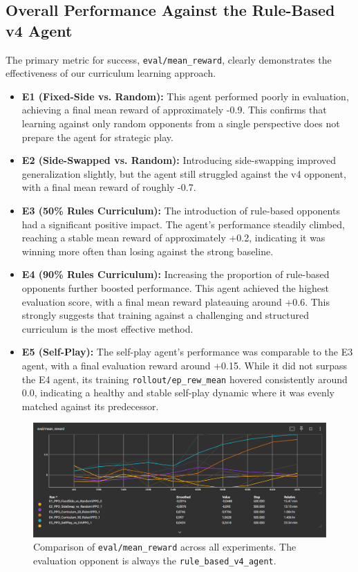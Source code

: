 \documentclass[conference]{IEEEtran}
\begin{document}
\subsection{Overall Performance Against the Rule-Based v4 Agent}
The primary metric for success, \texttt{eval/mean\_reward}, clearly demonstrates the effectiveness of our curriculum learning approach.
\begin{itemize}
    \item \textbf{E1 (Fixed-Side vs. Random):} This agent performed poorly in evaluation, achieving a final mean reward of approximately -0.9. This confirms that learning against only random opponents from a single perspective does not prepare the agent for strategic play.
    \item \textbf{E2 (Side-Swapped vs. Random):} Introducing side-swapping improved generalization slightly, but the agent still struggled against the v4 opponent, with a final mean reward of roughly -0.7.
    \item \textbf{E3 (50\% Rules Curriculum):} The introduction of rule-based opponents had a significant positive impact. The agent's performance steadily climbed, reaching a stable mean reward of approximately +0.2, indicating it was winning more often than losing against the strong baseline.
    \item \textbf{E4 (90\% Rules Curriculum):} Increasing the proportion of rule-based opponents further boosted performance. This agent achieved the highest evaluation score, with a final mean reward plateauing around +0.6. This strongly suggests that training against a challenging and structured curriculum is the most effective method.
    \item \textbf{E5 (Self-Play):} The self-play agent's performance was comparable to the E3 agent, with a final evaluation reward around +0.15. While it did not surpass the E4 agent, its training \texttt{rollout/ep\_rew\_mean} hovered consistently around 0.0, indicating a healthy and stable self-play dynamic where it was evenly matched against its predecessor.
\end{itemize}
\begin{figure}[htbp]
\centerline{\includegraphics[width=\columnwidth]{eval-mean-reward_allRuns.png}}
\caption{Comparison of \texttt{eval/mean\_reward} across all experiments. The evaluation opponent is always the \texttt{rule\_based\_v4\_agent}.}
\label{fig:eval_reward}
\end{figure}
\end{document}
